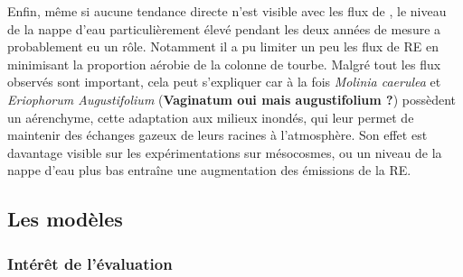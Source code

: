 Enfin, même si aucune tendance directe n'est visible avec les flux de \coo, le niveau de la nappe d'eau particulièrement élevé pendant les deux années de mesure a probablement eu un rôle.
Notamment il a pu limiter un peu les flux de RE en minimisant la proportion aérobie de la colonne de tourbe.
Malgré tout les flux observés sont important, cela peut s'expliquer car à la fois \textit{Molinia caerulea} et \textit{Eriophorum Augustifolium} (\textbf{Vaginatum oui mais augustifolium ?}) possèdent un aérenchyme, cette adaptation aux milieux inondés, qui leur permet de maintenir des échanges gazeux de leurs racines à l'atmosphère.
Son effet est davantage visible sur les expérimentations sur mésocosmes, ou un niveau de la nappe d'eau plus bas entraîne une augmentation des émissions de la RE.



\subsection*{Les modèles}

\subsubsection{Intérêt de l'évaluation}


